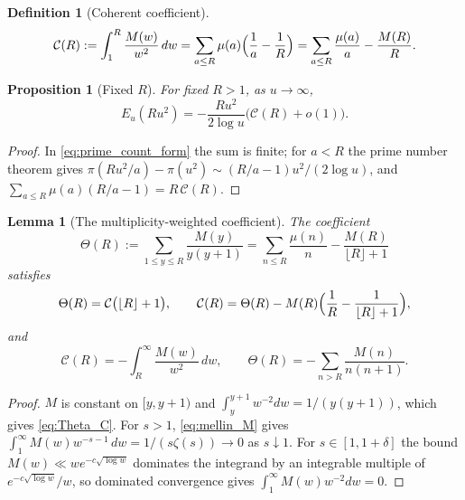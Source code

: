 \documentclass[11pt]{amsart}
\numberwithin{equation}{section}
\theoremstyle{plain}
\newtheorem{proposition}[theorem]{Proposition}
\newtheorem{lemma}[theorem]{Lemma}
\theoremstyle{definition}
\newtheorem{definition}[theorem]{Definition}
\theoremstyle{remark}
\newcommand{\Cc}{\mathcal{C}}
\begin{document}
\begin{definition}[Coherent coefficient]
\label{def:coherent_coefficient}
\begin{equation}
\label{eq:C_def}
  \Cc(R):=\int_1^R\frac{M(w)}{w^2}\,dw
  =\sum_{a\le R}\mu(a)\Bigl(\frac1a-\frac1R\Bigr)
  =\sum_{a\le R}\frac{\mu(a)}a-\frac{M(R)}R .
\end{equation}
\end{definition}

\begin{proposition}[Fixed $R$]
\label{prop:fixed_R_corrected}
For fixed $R>1$, as $u\to\infty$,
\begin{equation}
\label{eq:E_fixed_R}
  E_u(Ru^2)=-\frac{Ru^2}{2\log u}\bigl(\Cc(R)+o(1)\bigr).
\end{equation}
\end{proposition}

\begin{proof}
In \eqref{eq:prime_count_form} the sum is finite; for $a<R$ the prime number
theorem gives $\pi(Ru^2/a)-\pi(u^2)\sim(R/a-1)u^2/(2\log u)$, and
$\sum_{a\le R}\mu(a)(R/a-1)=R\,\Cc(R)$.
\end{proof}

\begin{lemma}[The multiplicity-weighted coefficient]
\label{lem:copy-weight-coefficient}
The coefficient
\begin{equation}
\label{eq:Theta_def}
  \Theta(R):=\sum_{1\le y\le R}\frac{M(y)}{y(y+1)}
  =\sum_{n\le R}\frac{\mu(n)}n-\frac{M(R)}{\lfloor R\rfloor+1}
\end{equation}
satisfies
\begin{equation}
\label{eq:Theta_C}
  \Theta(R)=\Cc\bigl(\lfloor R\rfloor+1\bigr),\qquad
  \Cc(R)=\Theta(R)-M(R)\Bigl(\frac1R-\frac1{\lfloor R\rfloor+1}\Bigr),
\end{equation}
and
\begin{equation}
\label{eq:C_tail}
  \Cc(R)=-\int_R^\infty\frac{M(w)}{w^2}\,dw,\qquad
  \Theta(R)=-\sum_{n>R}\frac{M(n)}{n(n+1)}.
\end{equation}
\end{lemma}

\begin{proof}
$M$ is constant on $[y,y+1)$ and $\int_y^{y+1}w^{-2}dw=1/(y(y+1))$, which
gives \eqref{eq:Theta_C}. For $s>1$, \eqref{eq:mellin_M} gives
$\int_1^\infty M(w)w^{-s-1}\,dw=1/(s\zeta(s))\to0$ as $s\downarrow1$. For
$s\in[1,1+\delta]$ the bound $M(w)\ll we^{-c\sqrt{\log w}}$ dominates the
integrand by an integrable multiple of $e^{-c\sqrt{\log w}}/w$, so dominated
convergence gives $\int_1^\infty M(w)w^{-2}dw=0$.
\end{proof}
\end{document}

